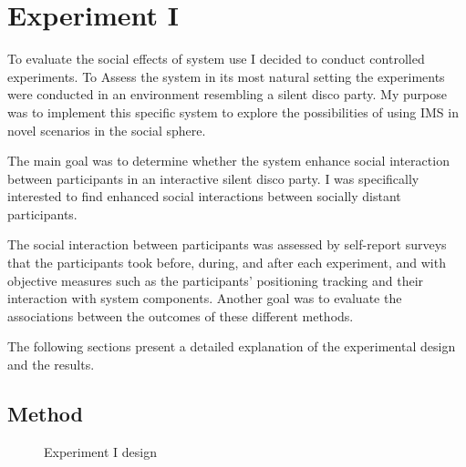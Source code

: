 \documentclass[a4paper,11pt]{article}
\begin{document}
{\section{Experiment I}

To evaluate the social effects of system use I decided to conduct controlled experiments.
To Assess the system in its most natural setting the experiments were conducted in an environment resembling a silent disco party.
My purpose was to implement this specific system to explore the possibilities of using IMS in novel scenarios in the social sphere.

The main goal was to determine whether the system enhance social interaction between participants in an interactive silent disco party.
I was specifically interested to find enhanced social interactions between socially distant participants.

The social interaction between participants was assessed by self-report surveys that the participants took before, during, and after each experiment, and with objective measures such as the participants' positioning tracking and their interaction with system components.
Another goal was to evaluate the associations between the outcomes of these different methods.

The following sections present a detailed explanation of the experimental design and the results.

\subsection{Method}

\begin{figure}[!htb]
	\centering
	\def\svgwidth{0.95\columnwidth}
  	
	\caption{Experiment I design}\label{fig:pilot}
\end{figure}

}
\end{document}
